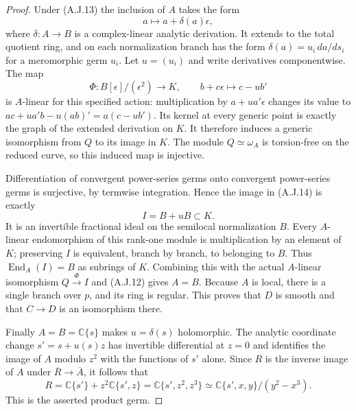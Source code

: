 \begin{proof}
Under (A.J.13) the inclusion of $A$ takes the form
\[
 a\longmapsto a+\delta(a)\epsilon,
\]
where $\delta:A\to B$ is a complex-linear analytic
derivation. It extends to the total quotient ring, and on
each normalization branch has the form
$\delta(a)=u_i\,da/ds_i$ for a meromorphic germ $u_i$.
Let $u=(u_i)$ and write derivatives componentwise.
The map
\[
 \Phi:B[\epsilon]/(\epsilon^2)\longrightarrow K,
 \qquad b+c\epsilon\longmapsto c-u b'
                                                        \tag{A.J.14}
\]
is $A$-linear for this specified action: multiplication by
$a+u a'\epsilon$ changes its value to
$ac+u a'b-u(ab)'=a(c-u b')$. Its kernel at every generic
point is exactly the graph of the extended derivation on
$K$. It therefore induces a generic isomorphism from $Q$
to its image in $K$. The module $Q\simeq\omega_A$ is
torsion-free on the reduced curve, so this induced map is
injective.

Differentiation of convergent power-series germs onto
convergent power-series germs is surjective, by termwise
integration. Hence the image in (A.J.14) is exactly
\[
 I=B+uB\subset K.                                \tag{A.J.15}
\]
It is an invertible fractional ideal on the semilocal
normalization $B$. Every $A$-linear endomorphism of this
rank-one module is multiplication by an element of $K$;
preserving $I$ is equivalent, branch by branch, to belonging
to $B$. Thus $\operatorname{End}_A(I)=B$ as subrings of
$K$. Combining this with the actual $A$-linear isomorphism
$Q\xrightarrow{\Phi}I$ and (A.J.12) gives $A=B$.
Because $A$ is local, there is a single branch over $p$,
and its ring is regular. This proves that $D$ is smooth
and that $C\to D$ is an isomorphism there.

Finally $A=B=\mathbb C\{s\}$ makes $u=\delta(s)$
holomorphic. The analytic coordinate change
$s'=s+u(s)z$ has invertible differential at $z=0$ and
identifies the image of $A$ modulo $z^2$ with the functions
of $s'$ alone. Since $R$ is the inverse image of $A$ under
$\overline R\to\overline A$, it follows that
\[
 R=\mathbb C\{s'\}+z^2\mathbb C\{s',z\}
   =\mathbb C\{s',z^2,z^3\}
   \simeq\mathbb C\{s',x,y\}/(y^2-x^3).
                                                        \tag{A.J.16}
\]
This is the asserted product germ.
\end{proof}



